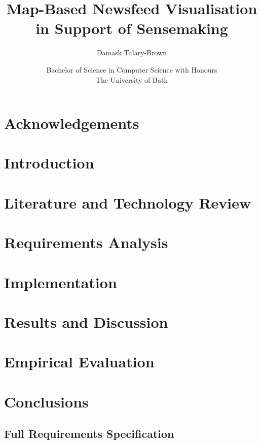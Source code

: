 \documentclass[11pt, a4paper]{report}
\title{\Huge\bfseries{Map-Based Newsfeed Visualisation in Support of Sensemaking}}
\author{Damask Talary-Brown}
\date{Bachelor of Science in Computer Science with Honours\\The University of Bath\\ \the\year}
\begin{document}
\lstset{language=Python, breaklines, breakatwhitespace, basicstyle=\small}


\setcounter{page}{0}
\maketitle
\newpage

\newpage

\newpage

\abstract
\newpage
\tableofcontents
\newpage
\listoffigures
\newpage
\listoftables
\newpage

\chapter{Acknowledgements}
\newpage


\chapter{Introduction}


\chapter{Literature and Technology Review}


\chapter{Requirements Analysis}


\chapter{Implementation}


\chapter{Results and Discussion}


\chapter{Empirical Evaluation}


\chapter{Conclusions}




\begin{appendices}
\chapter{Full Requirements Specification}

	
\end{appendices}
\end{document}
